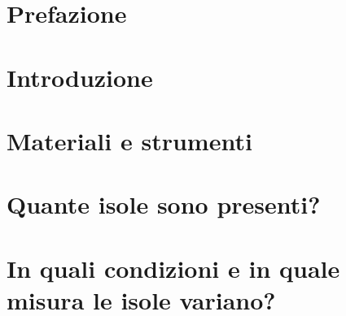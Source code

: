 \documentclass[12pt,a4paper,english,italian,twoside]{scrbook}
\begin{document}
\frontmatter


\tableofcontents
\listoffigures
\listoftables
\chapter{Prefazione}




\mainmatter
\chapter{Introduzione}




\chapter{Materiali e strumenti}




\chapter{Quante isole sono presenti?}







\chapter{In quali condizioni e in quale misura le isole variano?}




\end{document}
